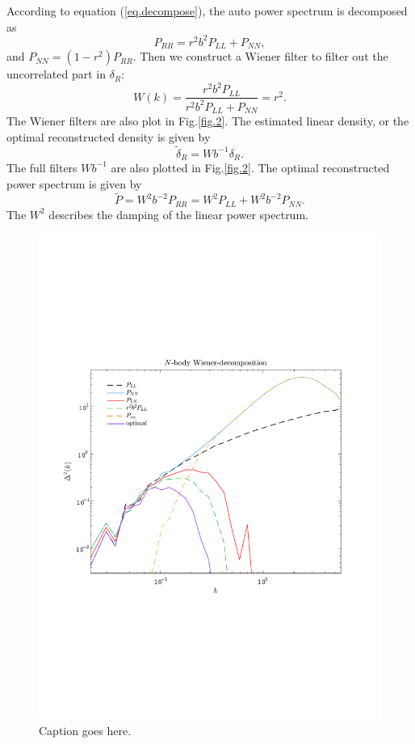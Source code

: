 \documentclass[aps,prd,twocolumn,superscriptaddress,amsfont,amssymb,amsmath,nofootinbib,showpacs,balancelastpage]{revtex4-1}
\begin{document}
According to equation (\ref{eq.decompose}), the auto power spectrum is decomposed as
\begin{equation}
    P_{RR}=r^2b^2P_{LL}+P_{NN},
\end{equation}
and $P_{NN}=(1-r^2)P_{RR}$. Then we construct a Wiener filter to filter out the uncorrelated part in $\delta_R$:
\begin{equation}
    W(k)=\frac{r^2b^2P_{LL}}{r^2b^2P_{LL}+P_{NN}}=r^2.
\end{equation}
The Wiener filters are also plot in Fig.\ref{fig.2}. The estimated linear density, or the optimal reconstructed density is given by
\begin{equation}
    \tilde\delta_R=Wb^{-1}\delta_R.
\end{equation}
The full filters $Wb^{-1}$ are also plotted in Fig.\ref{fig.2}. The optimal reconstructed power spectrum is given by
\begin{equation}
    \tilde P=W^2b^{-2}P_{RR}=W^2P_{LL}+W^2b^{-2}P_{NN}.
\end{equation}
The $W^2$ describes the damping of the linear power spectrum.







\begin{figure}[t] \centering
  \includegraphics[width=1.0\linewidth]{fig3.pdf}
  \caption{Caption goes here.}
  \label{fig.3}
\end{figure}
\end{document}
